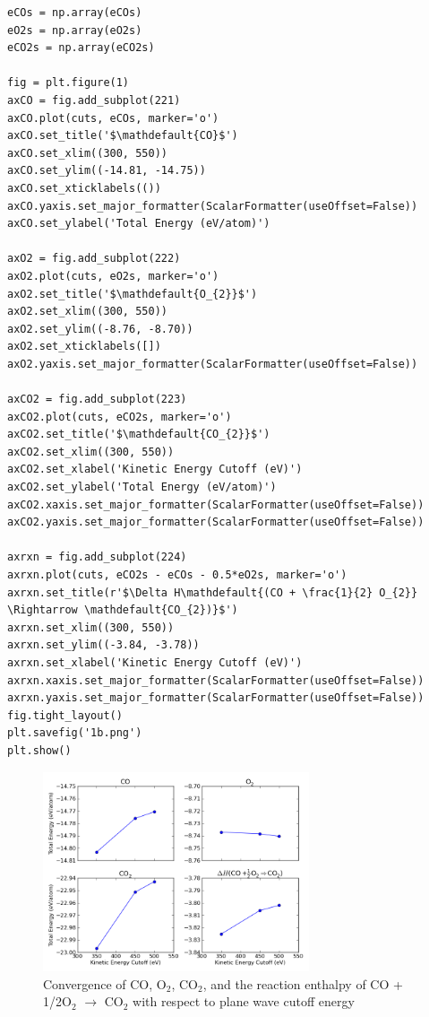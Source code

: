 \documentclass[11pt]{article}
\begin{document}
\begin{verbatim}
eCOs = np.array(eCOs)
eO2s = np.array(eO2s)
eCO2s = np.array(eCO2s)

fig = plt.figure(1)
axCO = fig.add_subplot(221)
axCO.plot(cuts, eCOs, marker='o')
axCO.set_title('$\mathdefault{CO}$')
axCO.set_xlim((300, 550))
axCO.set_ylim((-14.81, -14.75))
axCO.set_xticklabels(())
axCO.yaxis.set_major_formatter(ScalarFormatter(useOffset=False))
axCO.set_ylabel('Total Energy (eV/atom)')

axO2 = fig.add_subplot(222)
axO2.plot(cuts, eO2s, marker='o')
axO2.set_title('$\mathdefault{O_{2}}$')
axO2.set_xlim((300, 550))
axO2.set_ylim((-8.76, -8.70))
axO2.set_xticklabels([])
axO2.yaxis.set_major_formatter(ScalarFormatter(useOffset=False))

axCO2 = fig.add_subplot(223)
axCO2.plot(cuts, eCO2s, marker='o')
axCO2.set_title('$\mathdefault{CO_{2}}$')
axCO2.set_xlim((300, 550))
axCO2.set_xlabel('Kinetic Energy Cutoff (eV)')
axCO2.set_ylabel('Total Energy (eV/atom)')
axCO2.xaxis.set_major_formatter(ScalarFormatter(useOffset=False))
axCO2.yaxis.set_major_formatter(ScalarFormatter(useOffset=False))

axrxn = fig.add_subplot(224)
axrxn.plot(cuts, eCO2s - eCOs - 0.5*eO2s, marker='o')
axrxn.set_title(r'$\Delta H\mathdefault{(CO + \frac{1}{2} O_{2}} \Rightarrow \mathdefault{CO_{2})}$')
axrxn.set_xlim((300, 550))
axrxn.set_ylim((-3.84, -3.78))
axrxn.set_xlabel('Kinetic Energy Cutoff (eV)')
axrxn.xaxis.set_major_formatter(ScalarFormatter(useOffset=False))
axrxn.yaxis.set_major_formatter(ScalarFormatter(useOffset=False))
fig.tight_layout()
plt.savefig('1b.png')
plt.show()
\end{verbatim}


\begin{figure}[H]
\centering
\includegraphics[width=0.7\textwidth]{./1b.png}
\caption{Convergence of CO, O$_{2}$, CO$_{2}$, and the reaction enthalpy of CO + 1/2O$_{2}$ $\rightarrow$ CO$_{2}$ with respect to plane wave cutoff energy}
\end{figure}
\end{document}

